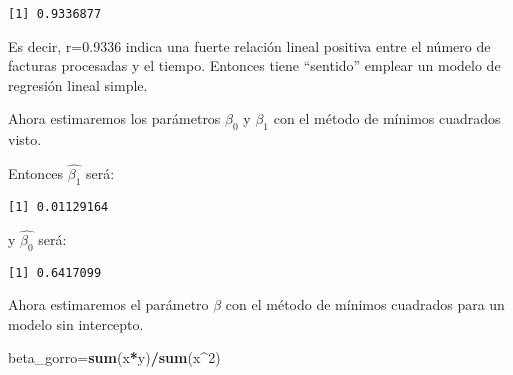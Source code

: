 \documentclass[
  a4paper,
  oneside,
  openany]{book}
\newenvironment{Shaded}{\begin{snugshade}}{\end{snugshade}}
\newcommand{\DecValTok}[1]{\textcolor[rgb]{0.00,0.00,0.81}{#1}}
\newcommand{\FunctionTok}[1]{\textcolor[rgb]{0.13,0.29,0.53}{\textbf{#1}}}
\newcommand{\NormalTok}[1]{#1}
\newcommand{\OtherTok}[1]{\textcolor[rgb]{0.56,0.35,0.01}{#1}}
\newcommand{\SpecialCharTok}[1]{\textcolor[rgb]{0.81,0.36,0.00}{\textbf{#1}}}
\begin{document}
\begin{verbatim}
[1] 0.9336877
\end{verbatim}

Es decir, r=0.9336 indica una fuerte relación lineal positiva entre el número de facturas procesadas y el tiempo. Entonces tiene ``sentido'' emplear un modelo de regresión lineal simple.

Ahora estimaremos los parámetros \(\beta_{0}\) y \(\beta_{1}\) con el método de mínimos cuadrados visto.

\begin{Shaded}
\end{Shaded}

Entonces \(\hat{\beta_{1}}\) será:

\begin{verbatim}
[1] 0.01129164
\end{verbatim}

y \(\hat{\beta_{0}}\) será:

\begin{verbatim}
[1] 0.6417099
\end{verbatim}

Ahora estimaremos el parámetro \(\beta\) con el método de mínimos cuadrados para un modelo sin intercepto.

\begin{Shaded}
\begin{Highlighting}[]
\NormalTok{beta\_gorro}\OtherTok{=}\FunctionTok{sum}\NormalTok{(x}\SpecialCharTok{*}\NormalTok{y)}\SpecialCharTok{/}\FunctionTok{sum}\NormalTok{(x}\SpecialCharTok{\^{}}\DecValTok{2}\NormalTok{)}
\end{Highlighting}
\end{Shaded}
\end{document}
